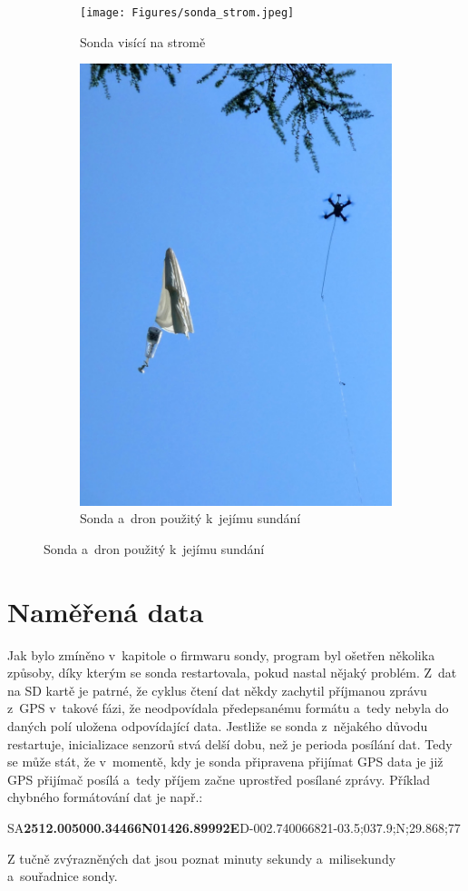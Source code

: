 \documentclass[twoside]{ctuthesis}
\theoremstyle{plain}
\theoremstyle{definition}
\theoremstyle{note}
\begin{document}
	\begin{figure}[hbtp]
		\centering
		\begin{subfigure}{.49\textwidth}
			\centering
			\texttt{[image: Figures/sonda\_strom.jpeg]}
			\caption{Sonda visící na stromě}
			\label{fig:sonda:strom}
		\end{subfigure}
		\begin{subfigure}{.49\textwidth}
			\centering
			\includegraphics[height=.8\textwidth]{Figures/sonda_dron.jpeg}
			\caption{Sonda a~dron použitý k~jejímu sundání}
			\label{fig:sonda:dron}			
		\end{subfigure}
	\end{figure}
	


	\section{Naměřená data}
	Jak bylo zmíněno v~kapitole o firmwaru sondy, program byl ošetřen několika způsoby, díky kterým se sonda restartovala, pokud nastal nějaký problém. Z~dat na SD kartě je patrné, že cyklus čtení dat někdy zachytil příjmanou zprávu z~GPS v~takové fázi, že neodpovídala předepsanému formátu a~tedy nebyla do daných polí uložena odpovídající data. Jestliže se sonda z~nějakého důvodu restartuje, inicializace senzorů stvá delší dobu, než je perioda posílání dat. Tedy se může stát, že v~momentě, kdy je sonda připravena přijímat GPS data je již GPS přijímač posílá a~tedy příjem začne uprostřed posílané zprávy. Příklad chybného formátování dat je např.:
	\begin{center}
		SA\textbf{2512.00}\textbf{5000.34466N01426.89992E}D-002.740066821-03.5;037.9;N;29.868;77
	\end{center}
	Z tučně zvýrazněných dat jsou poznat minuty sekundy a~milisekundy a~souřadnice sondy.
\end{document}
